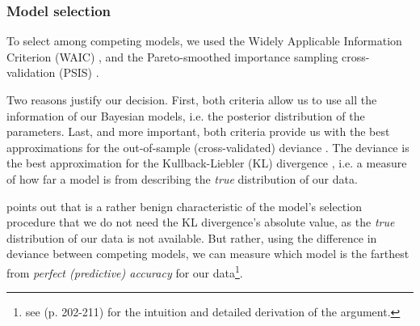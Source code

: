 \subsubsection{Model selection} \label{ssSA:model_selection}
%
To select among competing models, we used the Widely Applicable Information Criterion (WAIC) \citep{Watanabe_2013}, and the Pareto-smoothed importance sampling cross-validation (PSIS) \citep{Vehtari_et_al_2021}. 

Two reasons justify our decision. First, both criteria allow us to use all the information of our Bayesian models, i.e. the posterior distribution of the parameters. Last, and more important, both criteria provide us with the best approximations for the out-of-sample (cross-validated) deviance \citep{McElreath_2020}. The deviance is the best approximation for the Kullback-Liebler (KL) divergence \citep{Kullback_et_al_1951}, i.e. a measure of how far a model is from describing the \textit{true} distribution of our data. 

\citet{McElreath_2020} points out that is a rather benign characteristic of the model's selection procedure that we do not need the KL divergence's absolute value, as the \textit{true} distribution of our data is not available. But rather, using the difference in deviance between competing models, we can measure which model is the farthest from \textit{perfect (predictive) accuracy} for our data\footnote{see \citet{McElreath_2020} (p. 202-211) for the intuition and detailed derivation of the argument.}.
%
%